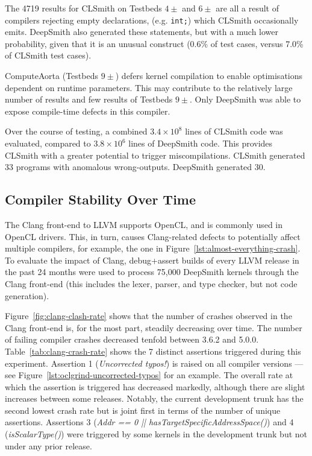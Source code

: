 The 4719 \abf results for CLSmith on Testbeds $4\pm$ and $6\pm$ are all a result of compilers rejecting empty declarations, (e.g. \texttt{int;}) which CLSmith occasionally emits. DeepSmith also generated these statements, but with a much lower probability, given that it is an unusual construct (0.6\% of test cases, versus 7.0\% of CLSmith test cases).

ComputeAorta (Testbeds $9\pm$) defers kernel compilation to enable optimisations dependent on runtime parameters. This may contribute to the relatively large number of \arc results and few \bc results of Testbeds $9\pm$. Only DeepSmith was able to expose compile-time defects in this compiler.

Over the course of testing, a combined $3.4 \times 10^8$ lines of CLSmith code was evaluated, compared to $3.8 \times 10^6$ lines of DeepSmith code. This provides CLSmith with a greater potential to trigger miscompilations. CLSmith generated 33 programs with anomalous wrong-outputs. DeepSmith generated 30.


\subsection{Compiler Stability Over Time}
\label{subsec:clangs}

The Clang front-end to LLVM supports OpenCL, and is commonly used in OpenCL drivers. This, in turn, causes Clang-related defects to potentially affect multiple compilers, for example, the one in Figure~\ref{lst:almost-everything-crash}. To evaluate the impact of Clang, debug+assert builds of every LLVM release in the past 24 months were used to process 75,000 DeepSmith kernels through the Clang front-end (this includes the lexer, parser, and type checker, but not code generation).

Figure~\ref{fig:clang-clash-rate} shows that the number of crashes observed in the Clang front-end is, for the most part, steadily decreasing over time. The number of failing compiler crashes decreased tenfold between 3.6.2 and 5.0.0. Table~\ref{tab:clang-crash-rate} shows the 7 distinct assertions triggered during this experiment. Assertion 1 (\emph{Uncorrected typos!}) is raised on all compiler versions --- see Figure~\ref{lst:oclgrind-uncorrected-typos} for an example. The overall rate at which the assertion is triggered has decreased markedly, although there are slight increases between some releases. Notably, the current development trunk has the second lowest crash rate but is joint first in terms of the number of unique assertions. Assertions 3 (\emph{Addr == 0 || hasTargetSpecificAddressSpace()}) and 4 (\emph{isScalarType()}) were triggered by some kernels in the development trunk but not under any prior release.

